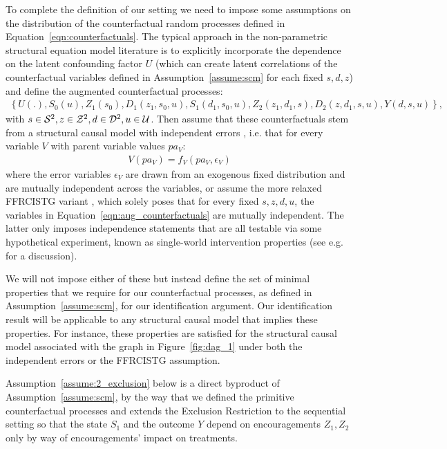 To complete the definition of our setting we need to impose some assumptions on the distribution of the counterfactual random processes defined in Equation~\eqref{eqn:counterfactuals}. The typical approach in the non-parametric structural equation model literature is to explicitly incorporate the dependence on the latent confounding factor $U$ (which can create latent correlations of the counterfactual variables defined in Assumption~\ref{assume:scm} for each fixed $s,d,z$) and define the augmented counterfactual processes:
\begin{align}
    \left\{U(.), S_0(u), Z_1(s_0), D_1(z_1, s_0, u), S_1(d_1, s_0, u), Z_2(z_1, d_1, s), D_2(z, d_1, s, u), Y(d, s, u)\right\}, \label{eqn:aug_counterfactuals}
\end{align}
with $s\in {\cal S}^2, z\in {\cal Z}^2, d\in {\cal D}^2, u\in {\cal U}$. 
Then assume that these counterfactuals stem from a structural causal model with independent errors \citep{pearl1995causal}, i.e. that for every variable $V$ with parent variable values $pa_V$:
\begin{align}
    V(pa_V) = f_V(pa_V, \epsilon_V)
\end{align}
where the error variables $\epsilon_V$ are drawn from an exogenous fixed distribution and are mutually independent across the variables,
or assume the more relaxed FFRCISTG variant \citep{robins1986new}, which solely poses that for every fixed $s, z, d, u$, the variables in Equation~\eqref{eqn:aug_counterfactuals}
are mutually independent. The latter only imposes independence statements that are all testable via some hypothetical experiment, known as single-world intervention properties (see e.g. \cite{richardson2013single} for a discussion). 

We will not impose either of these but instead define the set of minimal properties that we require for our counterfactual processes, as defined in Assumption~\ref{assume:scm}, for our identification argument. Our identification result will be applicable to any structural causal model that implies these properties. For instance, these properties are satisfied for the structural causal model associated with the graph in Figure~\ref{fig:dag_1} under both the independent errors or the FFRCISTG assumption.

Assumption~\ref{assume:2_exclusion} below is a direct byproduct of Assumption~\ref{assume:scm}, by the way that we defined the primitive counterfactual processes and extends the Exclusion Restriction \citep{imbens1994identification} to the sequential setting so that the state $S_1$ and the outcome $Y$ depend on encouragements $Z_1, Z_2$ only by way of encouragements' impact on treatments.

